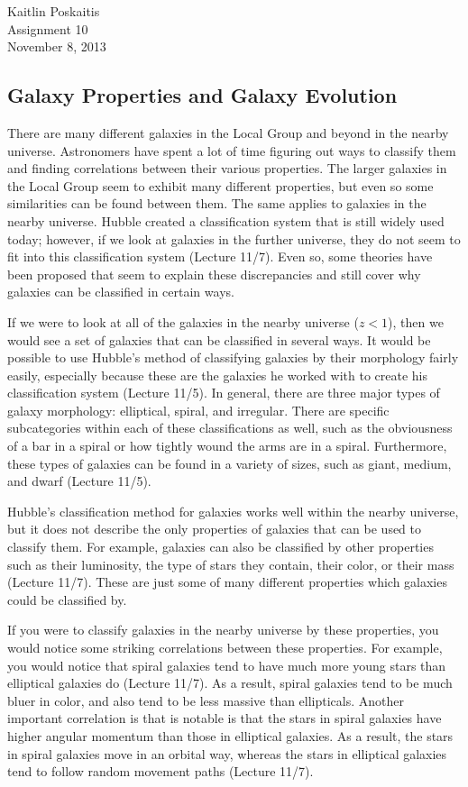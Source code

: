 \documentclass[12pt]{article}
\begin{document}
\noindent Kaitlin Poskaitis\\
Assignment 10\\
November 8, 2013
\begin{center}
    \section*{\bf Galaxy Properties and Galaxy Evolution}
\end{center}

There are many different galaxies in the Local Group and beyond in the nearby
universe.  Astronomers have spent a lot of time figuring out ways to classify
them and finding correlations between their various properties.  The larger
galaxies in the Local Group seem to exhibit many different properties, but even
so some similarities can be found between them.  The same applies to galaxies in
the nearby universe.  Hubble created a classification system that is still
widely used today; however, if we look at galaxies in the further universe, they
do not seem to fit into this classification system (Lecture 11/7).  Even so,
some theories have
been proposed that seem to explain these discrepancies and still cover why
galaxies can be classified in certain ways.

If we were to look at all of the galaxies in the nearby universe ($z<1$), then we
would see a set of galaxies that can be classified in several ways.  It would be
possible to use Hubble's method of classifying galaxies by their morphology
fairly easily, especially because these are the galaxies he worked with to
create his classification system (Lecture 11/5).  In general, there are three
major types of
galaxy morphology: elliptical, spiral, and irregular.  There are specific
subcategories within each of these classifications as well, such as the
obviousness of a bar in a spiral or how tightly wound the arms are in a spiral.
Furthermore, these types of galaxies can be found in a variety of sizes, such as
giant, medium, and dwarf (Lecture 11/5).

Hubble's classification method for galaxies works well within the nearby
universe, but it does not describe the only properties of galaxies that can be
used to classify them.  For example, galaxies can also be classified by other
properties such as their luminosity, the type of stars they contain, their
color, or their mass (Lecture 11/7).  These are just some of many different
properties which
galaxies could be classified by.

If you were to classify galaxies in the nearby universe by these properties, you
would notice some striking correlations between these properties.  For example,
you would notice that spiral galaxies tend to have much more young stars than
elliptical galaxies do (Lecture 11/7).  As a result, spiral galaxies tend to be
much bluer in
color, and also tend to be less massive than ellipticals.  Another important
correlation is that is notable is that the stars in spiral galaxies have higher
angular momentum than those in elliptical galaxies.  As a result, the stars in
spiral galaxies move in an orbital way, whereas the stars in elliptical galaxies
tend to follow random movement paths (Lecture 11/7).
\end{document}
